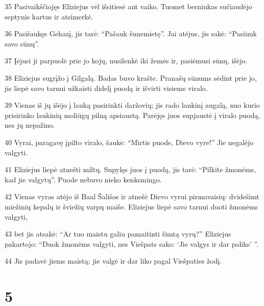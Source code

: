 \par 35 Pasivaikščiojęs Eliziejus vėl išsitiesė ant vaiko. Tuomet berniukas sučiaudėjo septynis kartus ir atsimerkė. 
\par 36 Pasišaukęs Gehazį, jis tarė: “Pašauk šunemietę”. Jai atėjus, jis sakė: “Pasiimk savo sūnų”. 
\par 37 Įėjusi ji parpuolė prie jo kojų, nusilenkė iki žemės ir, pasiėmusi sūnų, išėjo. 
\par 38 Eliziejus sugrįžo į Gilgalą. Badas buvo krašte. Pranašų sūnums sėdint prie jo, jis liepė savo tarnui užkaisti didelį puodą ir išvirti visiems viralo. 
\par 39 Vienas iš jų išėjo į lauką pasirinkti daržovių; jis rado laukinį augalą, nuo kurio prisirinko laukinių moliūgų pilną apsiaustą. Parėjęs juos supjaustė į viralo puodą, nes jų nepažino. 
\par 40 Vyrai, paragavę įpilto viralo, šaukė: “Mirtis puode, Dievo vyre!” Jie negalėjo valgyti. 
\par 41 Eliziejus liepė atnešti miltų. Supylęs juos į puodą, jis tarė: “Pilkite žmonėms, kad jie valgytų”. Puode nebuvo nieko kenksmingo. 
\par 42 Vienas vyras atėjo iš Baal Šališos ir atnešė Dievo vyrui pirmavaisių: dvidešimt miežinių kepalų ir šviežių varpų maiše. Eliziejus liepė savo tarnui duoti žmonėms valgyti, 
\par 43 bet jis atsakė: “Ar tuo maistu galiu pamaitinti šimtą vyrų?” Eliziejus pakartojo: “Duok žmonėms valgyti, nes Viešpats sako: ‘Jie valgys ir dar paliks’ ”. 
\par 44 Jis padavė jiems maistą; jie valgė ir dar liko pagal Viešpaties žodį.



\chapter{5}


